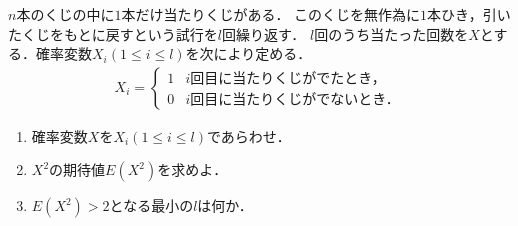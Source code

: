 $n$本のくじの中に$1$本だけ当たりくじがある．
このくじを無作為に$1$本ひき，引いたくじをもとに戻すという試行を$l$回繰り返す．
$l$回のうち当たった回数を$X$とする．確率変数$X_i (1\le i\le l)$を次により定める．
\begin{align*}
  X_i=
  \begin{cases}
    1 & \text{$i$回目に当たりくじがでたとき，}  \\
    0 & \text{$i$回目に当たりくじがでないとき．}
  \end{cases}
\end{align*}
\begin{enumerate}
  \item 確率変数$X$を$X_i (1\le i\le l)$であらわせ．
  \item $X^2$の期待値$E(X^2)$を求めよ．
  \item $E(X^2)>2$となる最小の$l$は何か．
\end{enumerate}